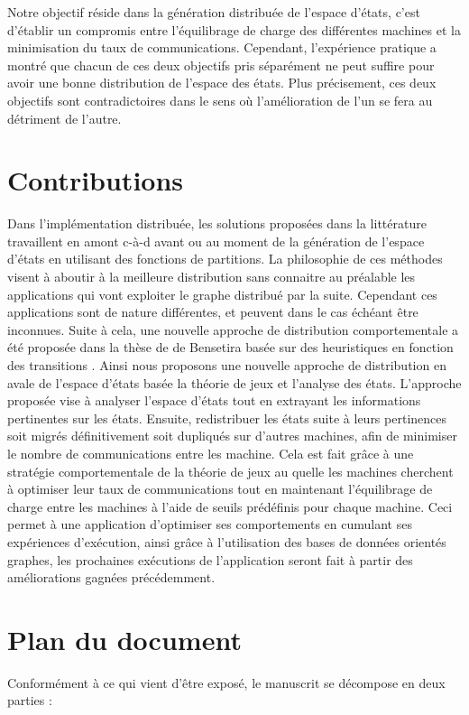 Notre objectif réside dans la génération distribuée de l'espace d'états, c'est d’établir un compromis entre l’équilibrage de charge des différentes machines et la minimisation du taux de communications. Cependant, l’expérience pratique a montré que chacun de ces deux objectifs pris séparément ne peut suffire pour avoir une bonne distribution de l’espace des états. Plus précisement, ces deux objectifs sont contradictoires dans le sens où l'amélioration de l'un se fera au détriment de l'autre.

\section*{Contributions}

Dans l’implémentation distribuée, les solutions proposées dans la littérature travaillent en amont c-à-d avant ou au moment de la génération de l’espace d’états en utilisant des fonctions de partitions. La philosophie de ces méthodes visent à aboutir à la meilleure distribution sans connaitre au préalable les applications qui vont exploiter le graphe distribué par la suite. Cependant ces applications sont de nature différentes, et peuvent dans le cas échéant être inconnues. Suite à cela, une nouvelle approche de distribution comportementale a été proposée dans la thèse de de Bensetira basée sur des heuristiques en fonction des transitions \citep{BENSETIRA2017}. Ainsi nous proposons une nouvelle approche de distribution en avale de l'espace d'états basée la théorie de jeux et l'analyse des états. L’approche proposée vise à analyser l'espace d’états tout en extrayant les informations pertinentes sur les états. Ensuite, redistribuer les états suite à leurs pertinences soit migrés définitivement soit dupliqués sur d’autres machines, afin de minimiser le nombre de communications entre les machine. Cela est fait grâce à une stratégie comportementale de la théorie de jeux au quelle les machines cherchent à optimiser leur taux de communications tout en maintenant l'équilibrage de charge entre les machines à l’aide de seuils prédéfinis pour chaque machine. Ceci permet à une application d'optimiser ses comportements en cumulant ses expériences d’exécution, ainsi grâce à l'utilisation des bases de données orientés graphes, les prochaines exécutions de l’application seront fait à partir des améliorations gagnées précédemment.

\section*{Plan du document}
Conformément à ce qui vient d’être exposé, le manuscrit se décompose en deux parties :

